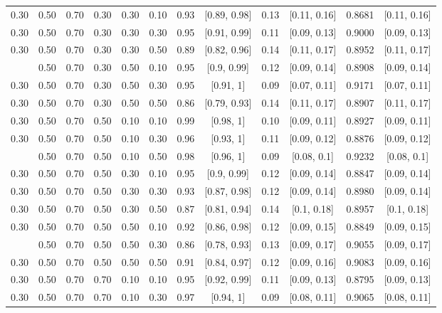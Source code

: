 \documentclass[
  11pt,
]{article}
\begin{document}
\begin{landscape}
\begin{ThreePartTable}
\begin{longtable}[t]{cccccccccccc}
0.30 & 0.50 & 0.70 & 0.30 & 0.30 & 0.10 & 0.93 & {}[0.89, 0.98] & 0.13 & {}[0.11, 0.16] & 0.8681 & {}[0.11, 0.16]\\
0.30 & 0.50 & 0.70 & 0.30 & 0.30 & 0.30 & 0.95 & {}[0.91, 0.99] & 0.11 & {}[0.09, 0.13] & 0.9000 & {}[0.09, 0.13]\\
0.30 & 0.50 & 0.70 & 0.30 & 0.30 & 0.50 & 0.89 & {}[0.82, 0.96] & 0.14 & {}[0.11, 0.17] & 0.8952 & {}[0.11, 0.17]\\
\addlinespace
0.30 & 0.50 & 0.70 & 0.30 & 0.50 & 0.10 & 0.95 & {}[0.9, 0.99] & 0.12 & {}[0.09, 0.14] & 0.8908 & {}[0.09, 0.14]\\
0.30 & 0.50 & 0.70 & 0.30 & 0.50 & 0.30 & 0.95 & {}[0.91, 1] & 0.09 & {}[0.07, 0.11] & 0.9171 & {}[0.07, 0.11]\\
0.30 & 0.50 & 0.70 & 0.30 & 0.50 & 0.50 & 0.86 & {}[0.79, 0.93] & 0.14 & {}[0.11, 0.17] & 0.8907 & {}[0.11, 0.17]\\
0.30 & 0.50 & 0.70 & 0.50 & 0.10 & 0.10 & 0.99 & {}[0.98, 1] & 0.10 & {}[0.09, 0.11] & 0.8927 & {}[0.09, 0.11]\\
0.30 & 0.50 & 0.70 & 0.50 & 0.10 & 0.30 & 0.96 & {}[0.93, 1] & 0.11 & {}[0.09, 0.12] & 0.8876 & {}[0.09, 0.12]\\
\addlinespace
0.30 & 0.50 & 0.70 & 0.50 & 0.10 & 0.50 & 0.98 & {}[0.96, 1] & 0.09 & {}[0.08, 0.1] & 0.9232 & {}[0.08, 0.1]\\
0.30 & 0.50 & 0.70 & 0.50 & 0.30 & 0.10 & 0.95 & {}[0.9, 0.99] & 0.12 & {}[0.09, 0.14] & 0.8847 & {}[0.09, 0.14]\\
0.30 & 0.50 & 0.70 & 0.50 & 0.30 & 0.30 & 0.93 & {}[0.87, 0.98] & 0.12 & {}[0.09, 0.14] & 0.8980 & {}[0.09, 0.14]\\
0.30 & 0.50 & 0.70 & 0.50 & 0.30 & 0.50 & 0.87 & {}[0.81, 0.94] & 0.14 & {}[0.1, 0.18] & 0.8957 & {}[0.1, 0.18]\\
0.30 & 0.50 & 0.70 & 0.50 & 0.50 & 0.10 & 0.92 & {}[0.86, 0.98] & 0.12 & {}[0.09, 0.15] & 0.8849 & {}[0.09, 0.15]\\
\addlinespace
0.30 & 0.50 & 0.70 & 0.50 & 0.50 & 0.30 & 0.86 & {}[0.78, 0.93] & 0.13 & {}[0.09, 0.17] & 0.9055 & {}[0.09, 0.17]\\
0.30 & 0.50 & 0.70 & 0.50 & 0.50 & 0.50 & 0.91 & {}[0.84, 0.97] & 0.12 & {}[0.09, 0.16] & 0.9083 & {}[0.09, 0.16]\\
0.30 & 0.50 & 0.70 & 0.70 & 0.10 & 0.10 & 0.95 & {}[0.92, 0.99] & 0.11 & {}[0.09, 0.13] & 0.8795 & {}[0.09, 0.13]\\
0.30 & 0.50 & 0.70 & 0.70 & 0.10 & 0.30 & 0.97 & {}[0.94, 1] & 0.09 & {}[0.08, 0.11] & 0.9065 & {}[0.08, 0.11]\\

\end{longtable}
\end{ThreePartTable}
\end{landscape}
\end{document}
